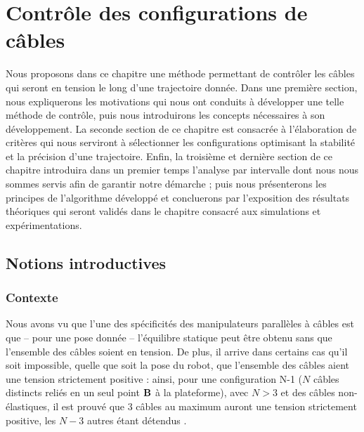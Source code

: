 \chapter{Contr\^ole des configurations de c\^ables}

Nous proposons dans ce chapitre une m\'ethode permettant de contr\^oler les
c\^ables qui seront en tension le long d'une trajectoire donn\'ee. Dans une
premi\`ere section, nous expliquerons les motivations qui nous ont
conduits \`a d\'evelopper une telle m\'ethode de contr\^ole, puis 
nous introduirons les concepts n\'ecessaires \`a son d\'eveloppement. La 
seconde section de ce chapitre est consacr\'ee \`a l'\'elaboration de 
crit\`eres qui nous serviront \`a s\'electionner les configurations optimisant 
la stabilit\'e et la pr\'ecision d'une trajectoire. Enfin, la troisi\`eme et 
derni\`ere section de ce chapitre introduira dans un premier temps l'analyse 
par intervalle dont nous nous sommes servis afin de garantir notre d\'emarche ; 
puis nous pr\'esenterons les principes de l'algorithme d\'evelopp\'e et 
concluerons par l'exposition des r\'esultats th\'eoriques qui seront valid\'es 
dans le chapitre consacr\'e aux simulations et exp\'eri\-mentations.

\section{Notions introductives}

\subsection{Contexte}

Nous avons vu que l'une des sp\'ecificit\'es des manipulateurs parall\`eles \`a
c\^ables est que -- pour une pose donn\'ee -- l'\'equilibre statique peut
\^etre obtenu sans que l'ensemble des c\^ables soient en tension. De plus, il
arrive dans certains cas qu'il soit impossible, quelle que soit la pose du 
robot, que l'ensemble des c\^ables aient une tension strictement positive : 
ainsi, pour une configuration N-1 ($N$ câbles distincts reliés en un seul point 
${\bf B}$ à la plateforme), avec $N> 3$ et des c\^ables non-\'elastiques, il
est prouv\'e que 3 c\^ables au maximum auront une tension strictement positive,
les $N-3$ autres \'etant d\'etendus \cite{merlet2012}.

